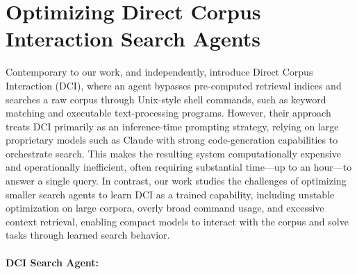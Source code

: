 \documentclass{llmxive}
\begin{document}
\section{Optimizing Direct Corpus Interaction Search Agents}


Contemporary to our work, and independently, \citet{dci-agent} introduce Direct Corpus Interaction (DCI), where an agent bypasses pre-computed retrieval indices and searches a raw corpus through Unix-style shell commands, such as keyword matching and executable text-processing programs. However, their approach treats DCI primarily as an inference-time prompting strategy, relying on large proprietary models such as Claude with strong code-generation capabilities to orchestrate search. This makes the resulting system computationally expensive and operationally inefficient, often requiring substantial time---up to an hour---to answer a single query. In contrast, our work studies the challenges of optimizing smaller search agents to learn DCI as a trained capability, including unstable optimization on large corpora, overly broad command usage, and excessive context retrieval, enabling compact models to interact with the corpus and solve tasks through learned search behavior.



\paragraph{DCI Search Agent:}
\end{document}
